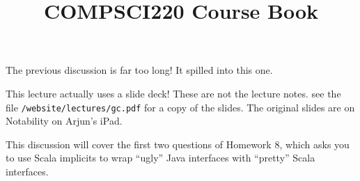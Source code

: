 \documentclass[9pt]{extbook}
\title{COMPSCI220 Course Book}
\begin{document}
\maketitle
\tableofcontents


















The previous discussion is far too long! It spilled into this one.



\newlecture

This lecture actually uses a slide deck! These are not the lecture notes.
see the file \texttt{/website/lectures/gc.pdf} for a copy of the slides.
The original slides are on Notability on Arjun's iPad.











































This discussion will cover the first two questions of Homework 8, which asks you to use Scala implicits to wrap ``ugly'' Java interfaces with ``pretty'' Scala interfaces.
\end{document}
